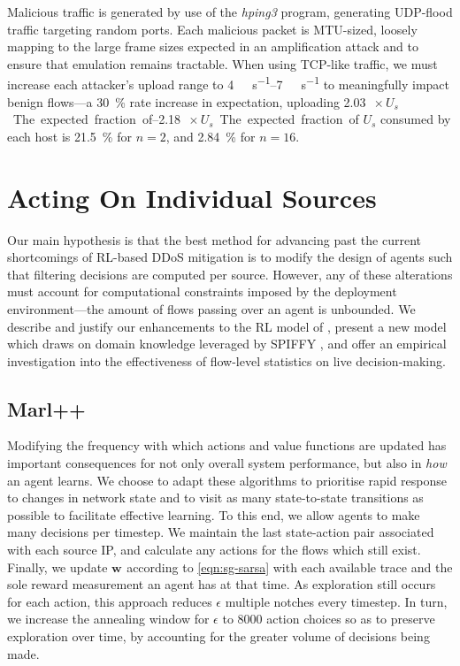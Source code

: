 \documentclass[conference, letterpaper, 10pt, times]{IEEEtran}
\newcommand{\wvec}[1]{\ensuremath{\bm{w}_{#1}}}
\newcommand{\fakepara}[1]{\noindent\textbf{#1:}}
\begin{document}
Malicious traffic is generated by use of the \emph{hping3} program, generating UDP-flood traffic targeting random ports.
Each malicious packet is MTU-sized, loosely mapping to the large frame sizes expected in an amplification attack and to ensure that emulation remains tractable.
When using TCP-like traffic, we must increase each attacker's upload range to \SIrange{4}{7}{\mega\bit\per\second} to meaningfully impact benign flows---a \SI{30}{\percent} rate increase in expectation, uploading \SIrange{2.03}{2.18}{$\! \times U_s$}.
The expected fraction of $U_s$ consumed by each host is \SI{21.5}{\percent} for $n=2$, and \SI{2.84}{\percent} for $n=16$.

\section{Acting On Individual Sources}\label{sec:acting-on-individual-sources}
Our main hypothesis is that the best method for advancing past the current shortcomings of RL-based DDoS mitigation is to modify the design of agents such that filtering decisions are computed per source.
However, any of these alterations must account for computational constraints imposed by the deployment environment---the amount of flows passing over an agent is unbounded.
We describe and justify our enhancements to the RL model of \textcite{DBLP:journals/eaai/MalialisK15}, present a new model which draws on domain knowledge leveraged by SPIFFY \cite{DBLP:conf/ndss/KangGS16}, and offer an empirical investigation into the effectiveness of flow-level statistics on live decision-making.

\subsection{Marl++}\label{sec:marl-plus}
Modifying the frequency with which actions and value functions are updated has important consequences for not only overall system performance, but also in \emph{how} an agent learns.
We choose to adapt these algorithms to prioritise rapid response to changes in network state and to visit as many state-to-state transitions as possible to facilitate effective learning.
To this end, we allow agents to make many decisions per timestep.
We maintain the last state-action pair associated with each source IP, and calculate any actions for the flows which still exist.
Finally, we update $\wvec{}$ according to \cref{eqn:sg-sarsa} with each available trace and the sole reward measurement an agent has at that time.
As exploration still occurs for each action, this approach reduces $\epsilon$ multiple notches every timestep.
In turn, we increase the annealing window for $\epsilon$ to \num{8000} action choices so as to preserve exploration over time, by accounting for the greater volume of decisions being made.
\end{document}
